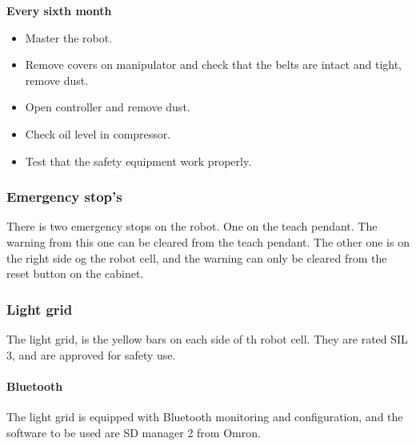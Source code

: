 \documentclass{article}
\begin{document}
        \textbf{Every sixth month}
        \begin{itemize}
            \item Master the robot.
            \item Remove covers on manipulator and check that the belts are intact and tight, remove dust.
            \item Open controller and remove dust. 
            \item Check oil level in compressor.
            \item Test that the safety equipment work properly.
        \end{itemize}
        
        \subsubsection{Emergency stop's}
        There is two emergency stops on the robot. One on the teach pendant. The warning from this one can be cleared from the teach pendant. The other one is on the right side og the robot cell, and the warning can only be cleared from the reset button on the cabinet.
        
        \newpage
        
        \subsubsection{Light grid}
        The light grid, is the yellow bars on each side of th robot cell. They are rated SIL 3, and are approved for safety use. 
        
        \paragraph{Bluetooth}
        The light grid is equipped with Bluetooth monitoring and configuration, and the software to be used are SD manager 2 from Omron.
        
\end{document}
